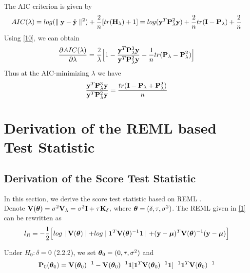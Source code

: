 \documentclass[11pt]{article}
\begin{document}
The AIC criterion is given by
\begin{align*}
AIC(\lambda)=log (\parallel {\bf y}-\hat{{\bf y}}\parallel ^2)+\frac{2}{n}[tr({\bf H}_\lambda)+1]=log({\bf y}^T {\bf P}_\lambda^2{\bf y})+\frac{2}{n}tr({\bf I}-{\bf P}_\lambda)+\frac{2}{n}
\end{align*}
Using \eqref{10}, we can obtain
\begin{align}
\frac{\partial AIC(\lambda)}{\partial \lambda}=\frac{2}{\lambda}\Big[1-\frac{{\bf y}^T {\bf P}_\lambda^3{\bf y}}{{\bf y}^T {\bf P}_\lambda^2{\bf y}}-\frac{1}{n}tr({\bf P}_\lambda-{\bf P}_\lambda^2)\Big]
\end{align}
Thus at the AIC-minimizing $\lambda$ we have
\begin{align*}
\frac{{\bf y}^T {\bf P}_\lambda^3{\bf y}}{{\bf y}^T {\bf P}_\lambda^2{\bf y}}=\frac{tr({\bf I}-{\bf P}_\lambda+{\bf P}_\lambda^2)}{n}
\end{align*}


\setcounter{equation}{0}
\renewcommand{\theequation}{2.\arabic{equation}}
\section{{\bf Derivation of the REML based Test Statistic}}
\subsection{\textbf{Derivation of the Score Test Statistic}}
In this section, we derive the score test statistic based on REML \citep{maity_powerful_2011}.\\ 
Denote ${\bf V}(\boldsymbol{\theta})=\sigma^2 {\bf V}_\lambda=\sigma^2{\bf I}+\tau {\bf K}_\delta$, where $\boldsymbol{\theta}=(\delta, \tau, \sigma^2)$. The REML given in \eqref{1} can be rewritten as
\begin{align}
l_R=-\frac{1}{2}\Big[log\mid {\bf V}(\boldsymbol{\theta}) \mid +log \mid \mathbf{1}^T{\bf V}(\boldsymbol{\theta})^{-1}\mathbf{1} \mid +({\bf y}-\boldsymbol{\mu})^T{\bf V}(\boldsymbol{\theta})^{-1}({\bf y}-\boldsymbol{\mu})\Big] \label{16}
\end{align}

Under $H_0: \delta=0$ (2.2.2), we set $\boldsymbol{\theta}_0=(0, \tau, \sigma^2)$ and
\begin{align*}
{\bf P}_0(\boldsymbol{\theta}_0)={\bf V}(\boldsymbol{\theta}_0)^{-1}-{\bf V}(\boldsymbol{\theta}_0)^{-1}\mathbf{1}[\mathbf{1}^T{\bf V}(\boldsymbol{\theta}_0)^{-1}\mathbf{1}]^{-1}\mathbf{1}^T{\bf V}(\boldsymbol{\theta}_0)^{-1}
\end{align*}
\end{document}
